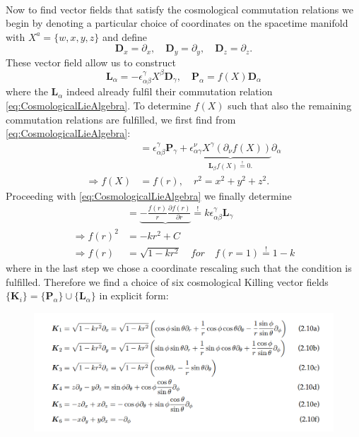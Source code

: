 \\
Now to find vector fields that satisfy the cosmological commutation relations we begin by
denoting a particular choice of coordinates on the spacetime manifold with $X^a = \{w, x, y, z\}$
and define
\begin{equation}
	\mathbf{D}_x =\partial_x, \quad \mathbf{D}_y=\partial_y, \quad \mathbf{D}_z=\partial_z.
\end{equation}
These vector field allow us to construct
\begin{equation}
	\mathbf{L}_\alpha= -\epsilon^\gamma_{\alpha \beta} X^\beta \mathbf{D}_\gamma, \quad \mathbf{P}_\alpha= f(X) \mathbf{D}_\alpha
\end{equation}
where the $\mathbf{L}_α$ indeed already fulfil their commutation relation \ref{eq:CosmologicalLieAlgebra}. To determine $f(X)$
such that also the remaining commutation relations are fulfilled, we first find from \ref{eq:CosmologicalLieAlgebra}:
\begin{align}
	[\mathbf{P}_\alpha, \mathbf{L}_\beta] &= \epsilon^\gamma_{\alpha \beta} \mathbf{P}_\gamma + \underbrace{ \epsilon^\nu_{\alpha \gamma} X^\gamma(\partial_\nu f(X))}_{\mathbf{L}_\beta f(X)  \stackrel{!}{=} 0.} \partial_\alpha \\
	\Rightarrow f(X)&=f(r), \quad r^2=x^2+y^2+z^2.
\end{align}
Proceeding with \ref{eq:CosmologicalLieAlgebra} we finally determine
\begin{align}
	[\mathbf{P}_\alpha, \mathbf{P}_\beta] &= \underbrace{-\frac{f(r)}{r} \frac{\partial f(r)}{\partial r} }{\stackrel{!}{=} k} \epsilon^\gamma_{\alpha \beta} \mathbf{L}_\gamma \\
	\Rightarrow f(r)^2 &= -k r^2 +C \\
	\Rightarrow f(r) &= \sqrt{1-kr^2} \quad for \quad f(r=1) \stackrel{!}{=} 1-k
\end{align}
where in the last step we chose a coordinate rescaling such that the condition is fulfilled.
Therefore we find a choice of six cosmological Killing vector fields $\{\mathbf{K}_i\} = \{\mathbf{P}_α\} \cup \{\mathbf{L}_α\}$
in explicit form:
\begin{figure}[h!]
	\centering
	\includegraphics[width=0.7\linewidth]{gfx/CosmologyKillingVectorFields}
	\caption{}
	\label{fig:cosmologykillingvectorfields}
\end{figure}

